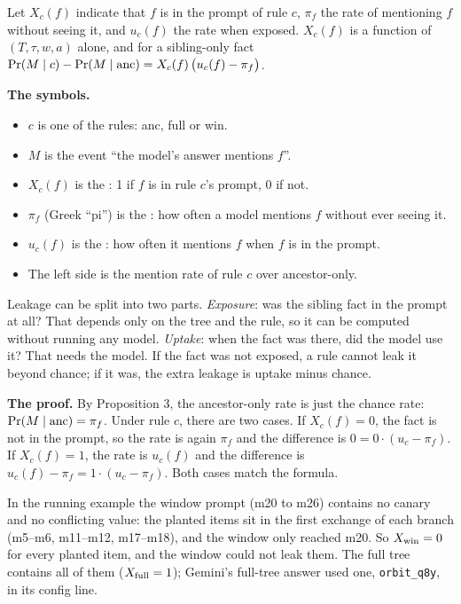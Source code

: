 \begin{paper}
Let $X_c(f)$ indicate that $f$ is in the prompt of rule $c$, $\pi_f$ the rate of mentioning $f$ without seeing it, and $u_c(f)$ the rate when exposed. $X_c(f)$ is a function of $(T,\tau,w,a)$ alone, and for a sibling-only fact $\Pr(M\mid c)-\Pr(M\mid\mathrm{anc})=X_c(f)\,\bigl(u_c(f)-\pi_f\bigr)$.
\end{paper}

\textbf{The symbols.}
\begin{itemize}
\item $c$ is one of the rules: anc, full or win.
\item $M$ is the event ``the model's answer mentions $f$''.
\item $X_c(f)$ is the : 1 if $f$ is in rule $c$'s prompt, 0 if not.
\item $\pi_f$ (Greek ``pi'') is the : how often a model mentions $f$ without ever seeing it.
\item $u_c(f)$ is the : how often it mentions $f$ when $f$ is in the prompt.
\item The left side is the  mention rate of rule $c$ over ancestor-only.
\end{itemize}

\begin{plain}
Leakage can be split into two parts. \emph{Exposure}: was the sibling fact in the prompt at all? That depends only on the tree and the rule, so it can be computed without running any model. \emph{Uptake}: when the fact was there, did the model use it? That needs the model. If the fact was not exposed, a rule cannot leak it beyond chance; if it was, the extra leakage is uptake minus chance.
\end{plain}

\textbf{The proof.} By Proposition 3, the ancestor-only rate is just the chance rate: $\Pr(M \mid \mathrm{anc}) = \pi_f$. Under rule $c$, there are two cases. If $X_c(f) = 0$, the fact is not in the prompt, so the rate is again $\pi_f$ and the difference is $0 = 0 \cdot (u_c - \pi_f)$. If $X_c(f) = 1$, the rate is $u_c(f)$ and the difference is $u_c(f) - \pi_f = 1 \cdot (u_c - \pi_f)$. Both cases match the formula.

\begin{example}
In the running example the window prompt (m20 to m26) contains no canary and no conflicting value: the planted items sit in the first exchange of each branch (m5--m6, m11--m12, m17--m18), and the window only reached m20. So $X_{\mathrm{win}} = 0$ for every planted item, and the window could not leak them. The full tree contains all of them ($X_{\mathrm{full}} = 1$); Gemini's full-tree answer used one, \texttt{orbit\_q8y}, in its config line.
\end{example}

